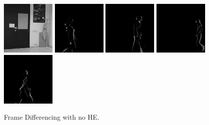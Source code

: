 \begin{subfigure}[t]{0.9\textwidth}
    \centering
    \includegraphics[scale=0.7]{figures/LASIESTA-PLAIN-DIFFERENCING/frame0}
    \hfill
    \includegraphics[scale=0.7]{figures/LASIESTA-PLAIN-DIFFERENCING/frame100}
    \hfill
    \includegraphics[scale=0.7]{figures/LASIESTA-PLAIN-DIFFERENCING/frame190}
    \hfill
    \includegraphics[scale=0.7]{figures/LASIESTA-PLAIN-DIFFERENCING/frame250}
    \hfill
    \includegraphics[scale=0.7]{figures/LASIESTA-PLAIN-DIFFERENCING/frame270}
    \caption{Frame Differencing with no HE.}
\end{subfigure}%
\\ \bigskip

